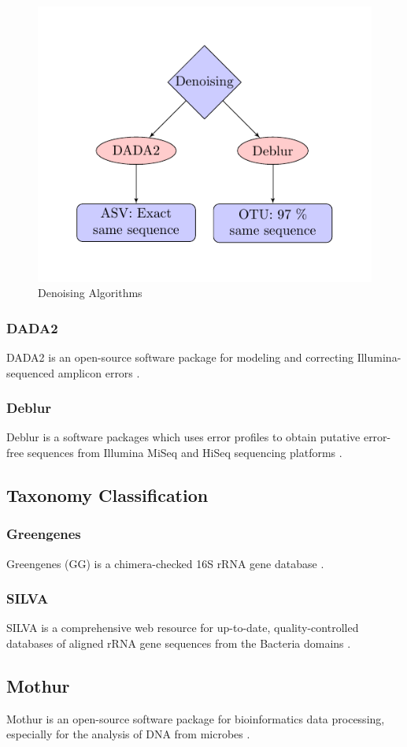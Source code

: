 \documentclass[a4paper]{article}
\begin{document}
            \begin{figure}[p]
                \centering
                \includegraphics[width=0.4 \linewidth]{figures/tikz/denoising.pdf}
                \caption{Denoising Algorithms}
                \label{fig:denoising}
            \end{figure}

            \subsubsection{DADA2}
                DADA2 is an open-source software package for modeling and correcting Illumina-sequenced amplicon errors \cite{DADA2}.

            \subsubsection{Deblur}
                Deblur is a software packages which uses error profiles to obtain putative error-free sequences from Illumina MiSeq and HiSeq sequencing platforms \cite{Deblur1}.

        \subsection{Taxonomy Classification}
            \subsubsection{Greengenes}
                Greengenes (GG) is a chimera-checked 16S rRNA gene database \cite{greengenes1}.

            \subsubsection{SILVA}
                SILVA is a comprehensive web resource for up-to-date, quality-controlled databases of aligned rRNA gene sequences from the Bacteria domains \cite{silva1, silva2}.

        \subsection{Mothur}
            Mothur is an open-source software package for bioinformatics data processing, especially for the analysis of DNA from microbes \cite{mothur1}.
\end{document}
